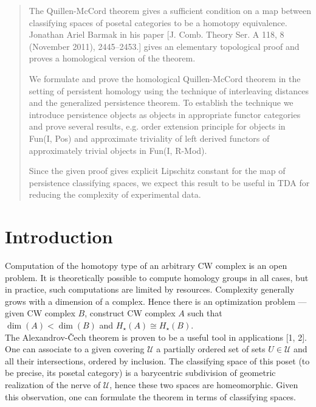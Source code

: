 \documentclass[english,12pt]{article}
\numberwithin{equation}{section}
\theoremstyle{definition}
\theoremstyle{remark}
\begin{document}
\begin{abstract}
The Quillen-McCord theorem gives a sufficient condition on a map between classifying spaces of posetal categories to be a homotopy equivalence. Jonathan Ariel Barmak in his paper [J. Comb. Theory Ser. A 118, 8 (November 2011), 2445–2453.] gives an elementary topological proof and proves a homological version of the theorem.

We formulate and prove the homological Quillen-McCord theorem in the setting of persistent homology using the technique of interleaving distances and the generalized persistence theorem. To establish the technique we introduce persistence objects as objects in appropriate functor categories and prove several results, e.g. order extension principle for objects in Fun(I, Pos) and approximate triviality of left derived functors of approximately trivial objects in Fun(I, R-Mod).

Since the given proof gives explicit Lipschitz constant for the map of persistence classifying spaces, we expect this result to be useful in TDA for reducing the complexity of experimental data.
\end{abstract}


\section{Introduction}

Computation of the homotopy type of an arbitrary CW complex is an open problem. It is theoretically possible to compute homology groups in all cases, but in practice, such computations are limited by resources. Complexity generally grows with a dimension of a complex. Hence there is an optimization problem --- given CW complex $B$, construct CW complex $A$ such that $\operatorname{dim}(A) < \operatorname{dim}(B)$ and $H_{\star}(A) \cong H_{\star}(B)$.\\

The Alexandrov-\v{C}ech theorem is proven to be a useful tool in applications [1, 2]. One can associate to a given covering $\mathcal{U}$ a partially ordered set of sets $U \in \mathcal{U}$ and all their intersections, ordered by inclusion. The classifying space of this poset (to be precise, its posetal category) is a barycentric subdivision of geometric realization of the nerve of $\mathcal{U}$, hence these two spaces are homeomorphic. Given this observation, one can formulate the theorem in terms of classifying spaces.\\
\end{document}
